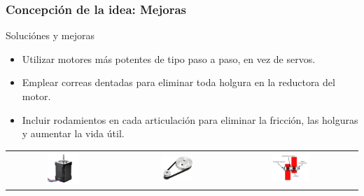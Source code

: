 \documentclass{beamer}
\begin{document}
\begin{frame}
  \frametitle{Concepción de la idea: Mejoras}
  
  \begin{block}{Soluciónes y mejoras}
    \begin{itemize}
    \item Utilizar motores más potentes de tipo paso a paso, en vez de servos.
    \item Emplear correas dentadas para eliminar toda holgura en la reductora del motor.
    \item Incluir rodamientos en cada articulación para eliminar la fricción, las holguras y aumentar la vida útil.
    \end{itemize}
  \end{block}
  \begin{tabular}{cccc}
    \includegraphics[width=0.3\textwidth, valign=m]{figs/nema1760.jpg} & \includegraphics[width=0.3\textwidth, valign=m]{figs/polea.png} 
    & \includegraphics[width=0.35\textwidth, valign=m]{figs/RodamientosBrida.png}
    
\end{tabular}
\end{frame}
\end{document}
